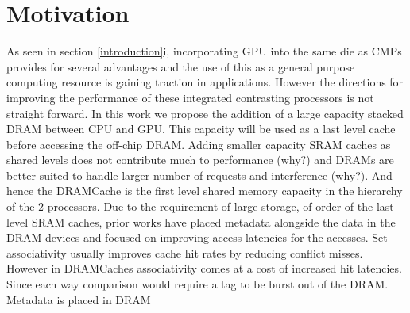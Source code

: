 \section{Motivation} \label{motivation}
As seen in section \ref{introduction}i, incorporating GPU into the same die as CMPs provides for several advantages and the use of this as a general purpose computing resource is gaining traction in applications. However the directions for improving the performance of these integrated contrasting processors is not straight forward. In this work we propose the addition of a large capacity stacked DRAM between CPU and GPU. This capacity will be used as a last level cache before accessing the off-chip DRAM. Adding smaller capacity SRAM caches as shared levels does not contribute much to performance (why?) and DRAMs are better suited to handle larger number of requests and interference (why?). And hence the DRAMCache is the first level shared memory capacity in the hierarchy of the 2 processors.
Due to the requirement of large storage, of order of the last level SRAM caches, prior works have placed metadata alongside the data in the DRAM devices and focused on improving access latencies for the accesses.
Set associativity usually improves cache hit rates by reducing conflict misses. However in DRAMCaches associativity comes at a cost of increased hit latencies. Since each way comparison would require a tag to be burst out of the DRAM. Metadata is placed in DRAM
